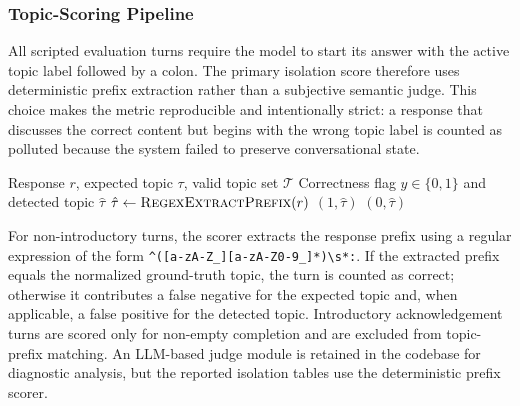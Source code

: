 \documentclass[pdflatex,sn-mathphys-num]{sn-jnl}%
\theoremstyle{thmstyleone}%
\theoremstyle{thmstyletwo}%
\theoremstyle{thmstylethree}%
\begin{document}
\subsubsection{Topic-Scoring Pipeline}\label{subsubsec:classify}

All scripted evaluation turns require the model to start its answer with the active topic label followed by a colon. The primary isolation score therefore uses deterministic prefix extraction rather than a subjective semantic judge. This choice makes the metric reproducible and intentionally strict: a response that discusses the correct content but begins with the wrong topic label is counted as polluted because the system failed to preserve conversational state.

\begin{algorithm}[htbp]
\caption{Deterministic Topic-Prefix Scoring}\label{alg:classify}
\begin{algorithmic}[1]
\Require Response $r$, expected topic $\tau$, valid topic set $\mathcal{T}$
\Ensure Correctness flag $y \in \{0,1\}$ and detected topic $\hat{\tau}$
\State $\hat{\tau} \gets \textsc{RegexExtractPrefix}(r)$ 
    \State \Return $(1, \hat{\tau})$
\Else
    \State \Return $(0, \hat{\tau})$
\EndIf
\end{algorithmic}
\end{algorithm}

For non-introductory turns, the scorer extracts the response prefix using a regular expression of the form \texttt{\^{}([a-zA-Z\_][a-zA-Z0-9\_]*)\textbackslash s*:}. If the extracted prefix equals the normalized ground-truth topic, the turn is counted as correct; otherwise it contributes a false negative for the expected topic and, when applicable, a false positive for the detected topic. Introductory acknowledgement turns are scored only for non-empty completion and are excluded from topic-prefix matching. An LLM-based judge module is retained in the codebase for diagnostic analysis, but the reported isolation tables use the deterministic prefix scorer.


\end{document}
